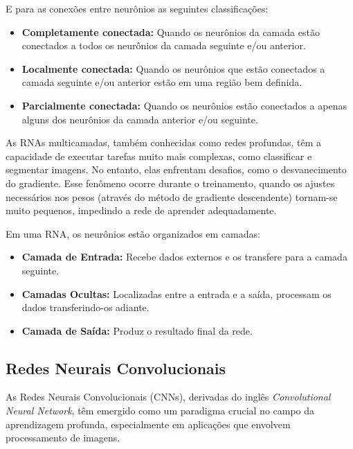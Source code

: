\documentclass[conference]{IEEEtran}
\begin{document}
E para as conexões entre neurônios as seguintes classificações:
\begin{itemize}
    \item {\textbf{Completamente conectada:}}
    Quando os neurônios da camada estão conectados a todos os neurônios da camada seguinte e/ou anterior.
    \item {\textbf{Localmente conectada:}}
    Quando os neurônios que estão conectados a camada seguinte e/ou anterior estão em uma região bem definida.
    \item {\textbf{Parcialmente conectada:}}
    Quando os neurônios estão conectados a apenas alguns dos neurônios da camada anterior e/ou seguinte.
\end{itemize}

As RNAs multicamadas, também conhecidas como redes profundas, têm a capacidade de executar tarefas 
muito mais complexas, como classificar e segmentar imagens. No entanto, elas enfrentam desafios, 
como o desvanecimento do gradiente. Esse fenômeno ocorre durante o treinamento, quando os ajustes 
necessários nos pesos (através do método de gradiente descendente) tornam-se muito pequenos, 
impedindo a rede de aprender adequadamente.

Em uma RNA, os neurônios estão organizados em camadas:
\begin{itemize}
    \item {\textbf{Camada de Entrada:}} Recebe dados externos e os transfere para a camada seguinte.

    \item {\textbf{Camadas Ocultas:}} Localizadas entre a entrada e a saída, processam os dados 
    transferindo-os adiante.
    
    \item {\textbf{Camada de Saída:}} Produz o resultado final da rede.
\end{itemize}

\subsection{Redes Neurais Convolucionais}
As Redes Neurais Convolucionais (CNNs), derivadas do inglês \emph{Convolutional Neural Network}, 
têm emergido como um paradigma crucial no campo da aprendizagem profunda, especialmente em aplicações 
que envolvem processamento de imagens.
\end{document}
